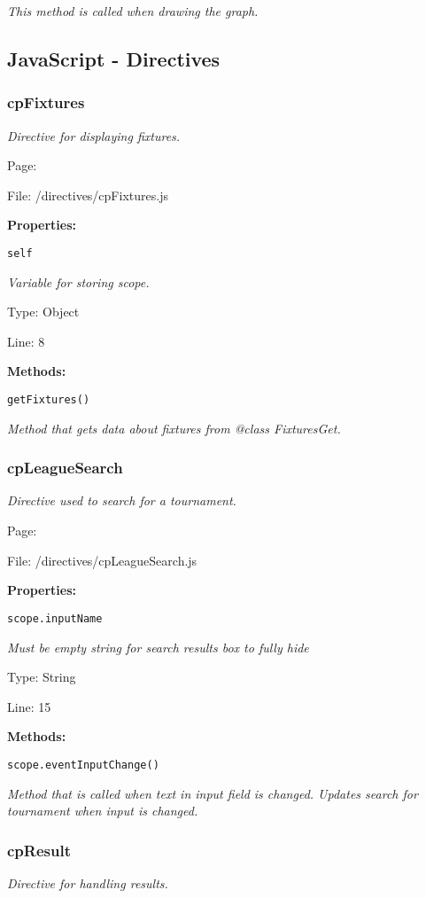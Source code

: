 {\scriptsize
\textit{This method is called when drawing the graph.}

}

\subsection{JavaScript - Directives}
\subsubsection{cpFixtures}\label{cpFixtures.js.doc}
\textit{Directive for displaying fixtures.}

Page: \pageref{cpFixtures.js}

File: /directives/cpFixtures.js

\textbf{Properties:}

\texttt{self}

{\scriptsize
\textit{Variable for storing scope.}

Type: Object

Line: 8

}
\textbf{Methods:}

\texttt{getFixtures()}

{\scriptsize
\textit{Method that gets data about fixtures from @class FixturesGet.}

}

\subsubsection{cpLeagueSearch}\label{cpLeagueSearch.js.doc}
\textit{Directive used to search for a tournament.}

Page: \pageref{cpLeagueSearch.js}

File: /directives/cpLeagueSearch.js

\textbf{Properties:}

\texttt{scope.inputName}

{\scriptsize
\textit{Must be empty string for search results box to fully hide}

Type: String

Line: 15

}
\textbf{Methods:}

\texttt{scope.eventInputChange()}

{\scriptsize
\textit{Method that is called when text in input field is changed.
Updates search for tournament when input is changed.}

}

\subsubsection{cpResult}\label{cpResult.js.doc}
\textit{Directive for handling results.}

